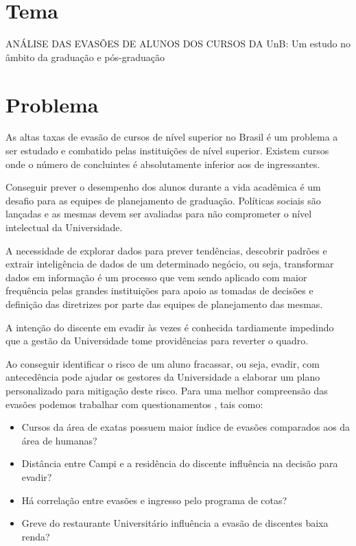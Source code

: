 \section{Tema}%
ANÁLISE DAS EVASÕES DE ALUNOS DOS CURSOS DA UnB: Um estudo no âmbito da graduação e pós-graduação

\section{Problema}%
As altas taxas de evasão de cursos de nível superior no Brasil é um problema a ser estudado e combatido pelas instituições de nível superior. Existem cursos onde o  número de concluintes é absolutamente inferior aos de ingressantes. 

Conseguir prever o desempenho dos alunos durante a vida acadêmica é um desafio para as equipes de planejamento de graduação. Políticas sociais são lançadas e as mesmas devem ser avaliadas para não comprometer o nível intelectual da Universidade.

A necessidade de explorar dados para prever tendências, descobrir padrões e extrair inteligência de dados de um determinado negócio, ou seja, transformar dados em informação é um processo que vem sendo aplicado com  maior frequência pelas grandes instituições para apoio as tomadas de decisões e definição das diretrizes por parte das equipes de planejamento das mesmas.

A intenção do discente em evadir às vezes é conhecida tardiamente impedindo que a gestão da Universidade tome providências para reverter o quadro.

Ao conseguir identificar o risco de um aluno fracassar, ou seja, evadir, com antecedência pode ajudar os gestores da Universidade a elaborar um plano personalizado para mitigação deste risco.
Para uma melhor compreensão das evasões podemos trabalhar com questionamentos , tais como:

\begin{enumerate} 
    \begin{itemize}
        \item	Cursos da área de exatas possuem maior índice de evasões comparados aos da área de humanas?
        \item	Distância entre Campi e a residência do discente influência na decisão para evadir?
        \item	Há correlação entre evasões e ingresso pelo programa de cotas?
        \item	Greve do restaurante Universitário influência a evasão de discentes baixa renda?
    \end{itemize}%
\end{enumerate}%

